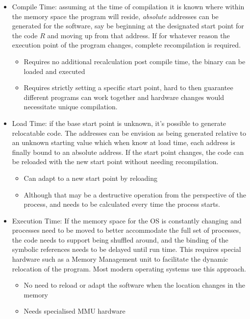 \documentclass[]{article}
\begin{document}
        \begin{itemize}
            \item Compile Time: assuming at the time of compilation it is known where within the memory space the program will reside, \textit{absolute} addresses can be generated for the software, say be beginning at the designated start point for the code $R$ and moving up from that address. If for whatever reason the execution point of the program changes, complete recompilation is required.
            \begin{itemize}
                \item Requires no additional recalculation post compile time, the binary can be loaded and executed
                \item Requires strictly setting a specific start point, hard to then guarantee different programs can work together and hardware changes would necessitate unique compilation.
            \end{itemize}
            \item Load Time: if the base start point is unknown, it's possible to generate relocatable code. The addresses can be envision as being generated relative to an unknown starting value which when know at load time, each address is finally bound to an absolute address. If the start point changes, the code can be reloaded with the new start point without needing recompilation.
            \begin{itemize}
                \item Can adapt to a new start point by reloading
                \item Although that may be a destructive operation from the perspective of the process, and needs to be calculated every time the process starts.
            \end{itemize}
            \item Execution Time: If the memory space for the OS is constantly changing and processes need to be moved to better accommodate the full set of processes, the code needs to support being shuffled around, and the binding of the symbolic references needs to be delayed until run time. This requires special hardware such as a Memory Management unit to facilitate the dynamic relocation of the program. Most modern operating systems use this approach.
            \begin{itemize}
                \item No need to reload or adapt the software when the location changes in the memory
                \item Needs specialised MMU hardware
            \end{itemize}
        \end{itemize}
\end{document}
